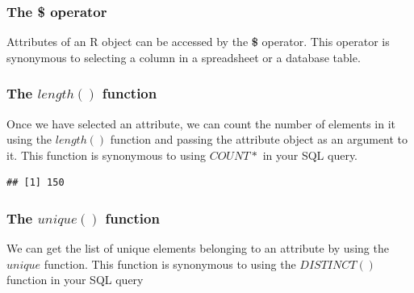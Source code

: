 \subsubsection{The \textbf{\$} operator}
\noindent Attributes of an R object can be accessed by the \textbf{\$} operator. This operator is synonymous to selecting a column in a spreadsheet or a database table.
\begin{knitrout}
\color{fgcolor}\begin{kframe}
\begin{alltt}
\hlkwb{<-}\hlopt{$}
\end{alltt}
\end{kframe}
\end{knitrout}

\subsubsection{The $length()$ function}
\noindent Once we have selected an attribute, we can count the number of elements in it using the $length()$  function and passing the attribute object as an argument to it. This function is synonymous to using $COUNT*$ in your SQL query.
\begin{knitrout}
\color{fgcolor}\begin{kframe}
\begin{alltt}
\hlopt{$}
\end{alltt}
\begin{verbatim}
## [1] 150
\end{verbatim}
\end{kframe}
\end{knitrout}

\subsubsection{The $unique()$ function}
\noindent We can get the list of unique elements belonging to an attribute by using the $unique$ function. This function is synonymous to using the $DISTINCT()$ function in your SQL query  
\begin{knitrout}
\color{fgcolor}\begin{kframe}
\begin{alltt}
\hlopt{$}
\end{alltt}
\end{kframe}
\end{knitrout}

